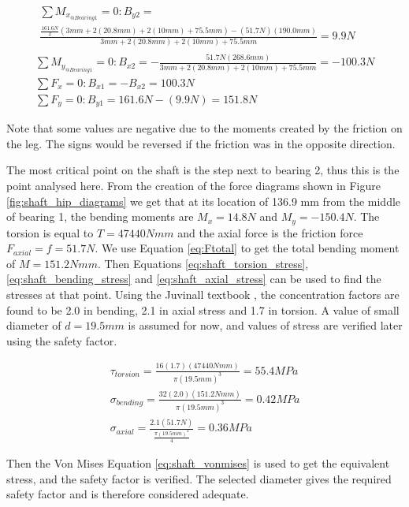 \begin{gather}
\begin{split}
    \sum M_{x_{@Bearing 1}}=0:  B_{y2}=
    \\
    \frac{\frac{161.6 N}{2}(3 mm+2(20.8 mm)+2(10 mm)+75.5 mm)-(51.7 N)(190.0 mm)}{3 mm+2(20.8 mm)+2(10 mm)+75.5 mm}=9.9 N 
\end{split}
    \\
    \sum M_{y_{@Bearing 1}}=0:  B_{x2}=-\frac{51.7 N(268.6 mm)}{3 mm+2(20.8 mm)+2(10 mm)+75.5 mm}=-100.3 N
    \\
    \sum F_x=0: B_{x1}=-B_{x2}=100.3 N
    \\
    \sum F_y=0: B_{y1}=161.6 N-(9.9 N)=151.8 N
\end{gather}

Note that some values are negative due to the moments created by the friction on the leg. The signs would be reversed if the friction was in the opposite direction.

The most critical point on the shaft is the step next to bearing 2, thus this is the point analysed here. From the creation of the force diagrams shown in Figure \ref{fig:shaft_hip_diagrams} we get that at its location of 136.9 mm from the middle of bearing 1, the bending moments are $M_x=14.8N$ and $M_y=-150.4N$. The torsion is equal to $T=47440 Nmm$ and the axial force is the friction force $F_{axial}=f=51.7N$. 
We use Equation \ref{eq:Ftotal} to get the total bending moment of $M=151.2 Nmm$.
Then Equations \ref{eq:shaft_torsion_stress}, \ref{eq:shaft_bending_stress} and \ref{eq:shaft_axial_stress} can be used to find the stresses at that point. Using the Juvinall textbook \cite{juvinall_fundamentals_2012}, the concentration factors are found to be 2.0 in bending, 2.1 in axial stress and 1.7 in torsion. A value of small diameter of $d=19.5 mm$ is assumed for now, and values of stress are verified later using the safety factor.

\begin{gather}
    \tau_{torsion}=\frac{16(1.7)(47440 Nmm)}{\pi{}(19.5 mm)^3}=55.4 MPa
    \\
    \sigma_{bending}=\frac{32(2.0)(151.2Nmm)}{\pi{}(19.5mm)^3}=0.42 MPa
    \\
    \sigma_{axial}=\frac{2.1(51.7N)}{\frac{\pi{}(19.5mm)^2}{4}}=0.36 MPa
\end{gather}

Then the Von Mises Equation \ref{eq:shaft_vonmises} is used to get the equivalent stress, and the safety factor is verified. The selected diameter gives the required safety factor and is therefore considered adequate.


